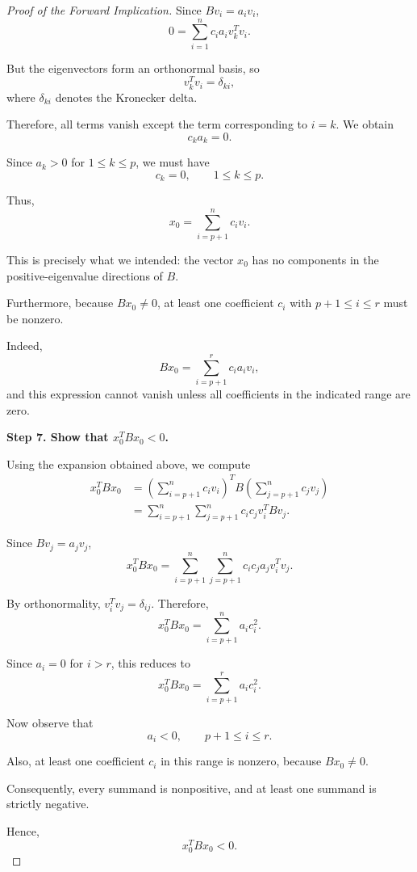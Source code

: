 \documentclass[11pt]{article}
\theoremstyle{definition}
\theoremstyle{remark}
\begin{document}
\begin{proof}[Proof of the Forward Implication]
Since $Bv_i=a_iv_i$,
\[
    0=\sum_{i=1}^{n}c_ia_iv_k^Tv_i.
\]

But the eigenvectors form an
orthonormal basis, so
\[
    v_k^Tv_i=\delta_{ki},
\]
where $\delta_{ki}$ denotes the
Kronecker delta.

Therefore, all terms vanish except
the term corresponding to $i=k$.
We obtain
\[
    \boxed{c_ka_k=0}.
\]

Since $a_k>0$ for $1\leq k\leq p$,
we must have
\[
    \boxed{c_k=0,\qquad 1\leq k\leq p}.
\]

Thus,
\[
    \boxed{
    x_0=\sum_{i=p+1}^{n}c_iv_i.
    }
\]

This is precisely what we intended:
the vector $x_0$ has no components
in the positive-eigenvalue directions
of $B$.

Furthermore, because $Bx_0\neq 0$,
at least one coefficient $c_i$ with
$p+1\leq i\leq r$ must be nonzero.

Indeed,
\[
    Bx_0=\sum_{i=p+1}^{r}c_ia_iv_i,
\]
and this expression cannot vanish
unless all coefficients in the indicated
range are zero.

\medskip

\textbf{Step 7. Show that $x_0^TBx_0<0$.}

Using the expansion obtained above,
we compute
\[
\begin{aligned}
    x_0^TBx_0
    &=
    \left(\sum_{i=p+1}^{n}c_iv_i\right)^T
    B\left(\sum_{j=p+1}^{n}c_jv_j\right)\\
    &=
    \sum_{i=p+1}^{n}
    \sum_{j=p+1}^{n}
    c_ic_jv_i^TBv_j.
\end{aligned}
\]

Since $Bv_j=a_jv_j$,
\[
    x_0^TBx_0
    =
    \sum_{i=p+1}^{n}
    \sum_{j=p+1}^{n}
    c_ic_ja_jv_i^Tv_j.
\]

By orthonormality, $v_i^Tv_j=\delta_{ij}$.
Therefore,
\[
    x_0^TBx_0
    =\sum_{i=p+1}^{n}a_ic_i^2.
\]

Since $a_i=0$ for $i>r$, this reduces to
\[
    \boxed{
    x_0^TBx_0
    =\sum_{i=p+1}^{r}a_ic_i^2.
    }
\]

Now observe that
\[
    a_i<0,
    \qquad p+1\leq i\leq r.
\]

Also, at least one coefficient
$c_i$ in this range is nonzero,
because $Bx_0\neq 0$.

Consequently, every summand is
nonpositive, and at least one
summand is strictly negative.

Hence,
\[
    \boxed{x_0^TBx_0<0}.
    \tag{1}
\]


\end{proof}
\end{document}
